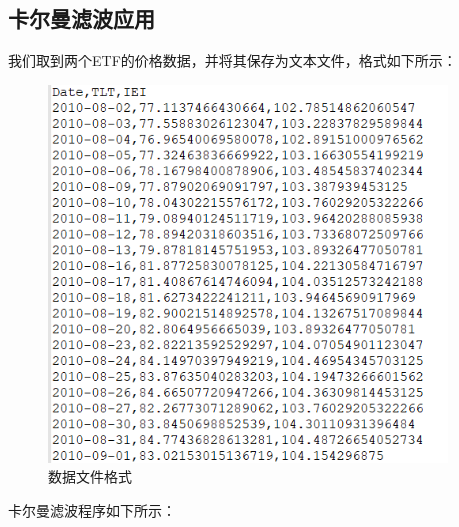 \subsection{卡尔曼滤波应用}
我们取到两个ETF的价格数据，并将其保存为文本文件，格式如下所示：
\begin{figure}[H]
	\caption{数据文件格式}
	\label{f000055}
	\centering
	\includegraphics[height=10cm]{images/f000055}
\end{figure}
卡尔曼滤波程序如下所示：

